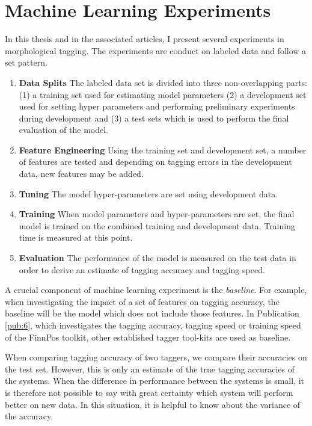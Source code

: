 \section{Machine Learning Experiments}

In this thesis and in the associated articles, I present several
experiments in morphological tagging. The experiments are conduct on
labeled data and follow a set pattern.

\begin{enumerate}
\item {\bf Data Splits} The labeled data set is divided into
  three non-overlapping parts: (1) a training set used for estimating
  model parameters (2) a development set used for setting hyper
  parameters and performing preliminary experiments during development
  and (3) a test sets which is used to perform the final evaluation of
  the model.
\item {\bf Feature Engineering} Using the training set and development
  set, a number of features are tested and depending on tagging errors
  in the development data, new features may be added.
\item {\bf Tuning} The model hyper-parameters are set using
  development data.
\item {\bf Training} When model parameters and hyper-parameters are
  set, the final model is trained on the combined training and
  development data. Training time is measured at this point.
\item {\bf Evaluation} The performance of the model is measured on the
  test data in order to derive an estimate of tagging accuracy and
  tagging speed.
\end{enumerate}

A crucial component of machine learning experiment is the {\it
  baseline}. For example, when investigating the impact of a set of
features on tagging accuracy, the baseline will be the model which
does not include those features. In Publication \ref{pub:6}, which
investigates the tagging accuracy, tagging speed or training speed of
the FinnPos toolkit, other established tagger tool-kits are used as
baseline.

When comparing tagging accuracy of two taggers, we compare their
accuracies on the test set. However, this is only an estimate of the
true tagging accuracies of the systems. When the difference in
performance between the systems is small, it is therefore not possible
to say with great certainty which system will perform better on new
data. In this situation, it is helpful to know about the variance of
the accuracy. 


